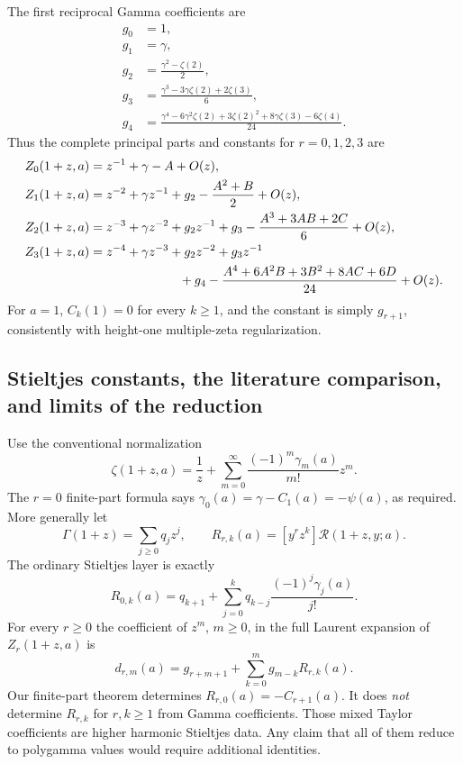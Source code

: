 The first reciprocal Gamma coefficients are
\begin{align}
 g_0&=1,\\
 g_1&=\gamma,\\
 g_2&=\frac{\gamma^2-\zeta(2)}2,\\
 g_3&=\frac{\gamma^3-3\gamma\zeta(2)+2\zeta(3)}6,\\
 g_4&=\frac{\gamma^4-6\gamma^2\zeta(2)+3\zeta(2)^2
                    +8\gamma\zeta(3)-6\zeta(4)}{24}.
 \label{harm:eq:first-g}
\end{align}
Thus the complete principal parts and constants for $r=0,1,2,3$ are
\begin{align}
 Z_0(1+z,a)&=z^{-1}+\gamma-A+O(z),\\
 Z_1(1+z,a)&=z^{-2}+\gamma z^{-1}
                   +g_2-\frac{A^2+B}{2}+O(z),\\
 Z_2(1+z,a)&=z^{-3}+\gamma z^{-2}+g_2z^{-1}
                   +g_3-\frac{A^3+3AB+2C}{6}+O(z),\\
 Z_3(1+z,a)&=z^{-4}+\gamma z^{-3}+g_2z^{-2}+g_3z^{-1}\notag\\
 &\hspace{25mm}+g_4-
       \frac{A^4+6A^2B+3B^2+8AC+6D}{24}+O(z).
 \label{harm:eq:finite-part-table}
\end{align}
For $a=1$, $C_k(1)=0$ for every $k\ge1$, and the constant is simply
$g_{r+1}$, consistently with height-one multiple-zeta regularization.

\subsection{Stieltjes constants, the literature comparison, and limits of the reduction}

Use the conventional normalization
\begin{equation}\label{harm:eq:Stieltjes-convention}
 \zeta(1+z,a)=\frac1z+
        \sum_{m=0}^{\infty}\frac{(-1)^m\gamma_m(a)}{m!}z^m.
\end{equation}
The $r=0$ finite-part formula says
$\gamma_0(a)=\gamma-C_1(a)=-\psi(a)$, as required.  More generally let
\[
 \Gamma(1+z)=\sum_{j\ge0}q_jz^j,
 \qquad R_{r,k}(a)=[y^rz^k]\mathcal R(1+z,y;a).
\]
The ordinary Stieltjes layer is exactly
\begin{equation}\label{harm:eq:Stieltjes-boundary}
 R_{0,k}(a)=q_{k+1}+
       \sum_{j=0}^{k}q_{k-j}\frac{(-1)^j\gamma_j(a)}{j!}.
\end{equation}
For every $r\ge0$ the coefficient of $z^m$, $m\ge0$, in the full
Laurent expansion of $Z_r(1+z,a)$ is
\begin{equation}\label{harm:eq:higher-coefficient}
 d_{r,m}(a)=g_{r+m+1}+
                  \sum_{k=0}^{m}g_{m-k}R_{r,k}(a).
\end{equation}
Our finite-part theorem determines $R_{r,0}(a)=-C_{r+1}(a)$.  It does
\emph{not} determine $R_{r,k}$ for $r,k\ge1$ from Gamma coefficients.
Those mixed Taylor coefficients are higher harmonic Stieltjes data.
Any claim that all of them reduce to polygamma values would require
additional identities.

